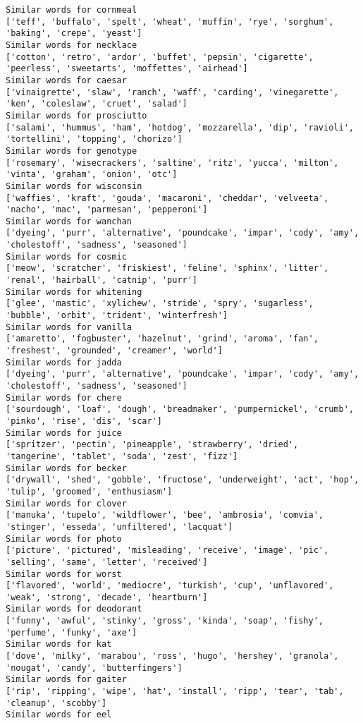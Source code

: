 \documentclass[11pt]{article}
\begin{document}
\begin{Verbatim}[commandchars=\\\{\}]
Similar words for cornmeal
['teff', 'buffalo', 'spelt', 'wheat', 'muffin', 'rye', 'sorghum', 'baking', 'crepe', 'yeast']
Similar words for necklace
['cotton', 'retro', 'ardor', 'buffet', 'pepsin', 'cigarette', 'peerless', 'sweetarts', 'moffettes', 'airhead']
Similar words for caesar
['vinaigrette', 'slaw', 'ranch', 'waff', 'carding', 'vinegarette', 'ken', 'coleslaw', 'cruet', 'salad']
Similar words for prosciutto
['salami', 'hummus', 'ham', 'hotdog', 'mozzarella', 'dip', 'ravioli', 'tortellini', 'topping', 'chorizo']
Similar words for genotype
['rosemary', 'wisecrackers', 'saltine', 'ritz', 'yucca', 'milton', 'vinta', 'graham', 'onion', 'otc']
Similar words for wisconsin
['waffies', 'kraft', 'gouda', 'macaroni', 'cheddar', 'velveeta', 'nacho', 'mac', 'parmesan', 'pepperoni']
Similar words for wanchan
['dyeing', 'purr', 'alternative', 'poundcake', 'impar', 'cody', 'amy', 'cholestoff', 'sadness', 'seasoned']
Similar words for cosmic
['meow', 'scratcher', 'friskiest', 'feline', 'sphinx', 'litter', 'renal', 'hairball', 'catnip', 'purr']
Similar words for whitening
['glee', 'mastic', 'xylichew', 'stride', 'spry', 'sugarless', 'bubble', 'orbit', 'trident', 'winterfresh']
Similar words for vanilla
['amaretto', 'fogbuster', 'hazelnut', 'grind', 'aroma', 'fan', 'freshest', 'grounded', 'creamer', 'world']
Similar words for jadda
['dyeing', 'purr', 'alternative', 'poundcake', 'impar', 'cody', 'amy', 'cholestoff', 'sadness', 'seasoned']
Similar words for chere
['sourdough', 'loaf', 'dough', 'breadmaker', 'pumpernickel', 'crumb', 'pinko', 'rise', 'dis', 'scar']
Similar words for juice
['spritzer', 'pectin', 'pineapple', 'strawberry', 'dried', 'tangerine', 'tablet', 'soda', 'zest', 'fizz']
Similar words for becker
['drywall', 'shed', 'gobble', 'fructose', 'underweight', 'act', 'hop', 'tulip', 'groomed', 'enthusiasm']
Similar words for clover
['manuka', 'tupelo', 'wildflower', 'bee', 'ambrosia', 'comvia', 'stinger', 'esseda', 'unfiltered', 'lacquat']
Similar words for photo
['picture', 'pictured', 'misleading', 'receive', 'image', 'pic', 'selling', 'same', 'letter', 'received']
Similar words for worst
['flavored', 'world', 'mediocre', 'turkish', 'cup', 'unflavored', 'weak', 'strong', 'decade', 'heartburn']
Similar words for deodorant
['funny', 'awful', 'stinky', 'gross', 'kinda', 'soap', 'fishy', 'perfume', 'funky', 'axe']
Similar words for kat
['dove', 'milky', 'marabou', 'ross', 'hugo', 'hershey', 'granola', 'nougat', 'candy', 'butterfingers']
Similar words for gaiter
['rip', 'ripping', 'wipe', 'hat', 'install', 'ripp', 'tear', 'tab', 'cleanup', 'scobby']
Similar words for eel

\end{Verbatim}
\end{document}
